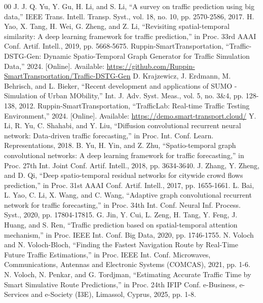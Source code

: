 \documentclass[conference]{IEEEtran}
\begin{document}
\begin{thebibliography}{00}
 J. J. Q. Yu, Y. Gu, H. Li, and S. Li, ``A survey on traffic prediction using big data,'' IEEE Trans. Intell. Transp. Syst., vol. 18, no. 10, pp. 2570-2586, 2017.
 H. Yao, X. Tang, H. Wei, G. Zheng, and Z. Li, ``Revisiting spatial-temporal similarity: A deep learning framework for traffic prediction,'' in Proc. 33rd AAAI Conf. Artif. Intell., 2019, pp. 5668-5675.
 Ruppin-SmartTransportation, ``Traffic-DSTG-Gen: Dynamic Spatio-Temporal Graph Generator for Traffic Simulation Data,'' 2024. [Online]. Available: \url{https://github.com/Ruppin-SmartTransportation/Traffic-DSTG-Gen}
 D. Krajzewicz, J. Erdmann, M. Behrisch, and L. Bieker, ``Recent development and applications of SUMO - Simulation of Urban MObility,'' Int. J. Adv. Syst. Meas., vol. 5, no. 3\&4, pp. 128-138, 2012.
 Ruppin-SmartTransportation, ``TrafficLab: Real-time Traffic Testing Environment,'' 2024. [Online]. Available: \url{https://demo.smart-transport.cloud/}
 Y. Li, R. Yu, C. Shahabi, and Y. Liu, ``Diffusion convolutional recurrent neural network: Data-driven traffic forecasting,'' in Proc. Int. Conf. Learn. Representations, 2018.
 B. Yu, H. Yin, and Z. Zhu, ``Spatio-temporal graph convolutional networks: A deep learning framework for traffic forecasting,'' in Proc. 27th Int. Joint Conf. Artif. Intell., 2018, pp. 3634-3640.
 J. Zhang, Y. Zheng, and D. Qi, ``Deep spatio-temporal residual networks for citywide crowd flows prediction,'' in Proc. 31st AAAI Conf. Artif. Intell., 2017, pp. 1655-1661.
 L. Bai, L. Yao, C. Li, X. Wang, and C. Wang, ``Adaptive graph convolutional recurrent network for traffic forecasting,'' in Proc. 34th Int. Conf. Neural Inf. Process. Syst., 2020, pp. 17804-17815.
 G. Jin, Y. Cui, L. Zeng, H. Tang, Y. Feng, J. Huang, and S. Ren, ``Traffic prediction based on spatial-temporal attention mechanism,'' in Proc. IEEE Int. Conf. Big Data, 2020, pp. 1746-1755.
 N. Voloch and N. Voloch-Bloch, ``Finding the Fastest Navigation Route by Real-Time Future Traffic Estimations,'' in Proc. IEEE Int. Conf. Microwaves, Communications, Antennas and Electronic Systems (COMCAS), 2021, pp. 1-6.
 N. Voloch, N. Penkar, and G. Tordjman, ``Estimating Accurate Traffic Time by Smart Simulative Route Predictions,'' in Proc. 24th IFIP Conf. e-Business, e-Services and e-Society (I3E), Limassol, Cyprus, 2025, pp. 1-8.
\end{thebibliography}
\end{document}
